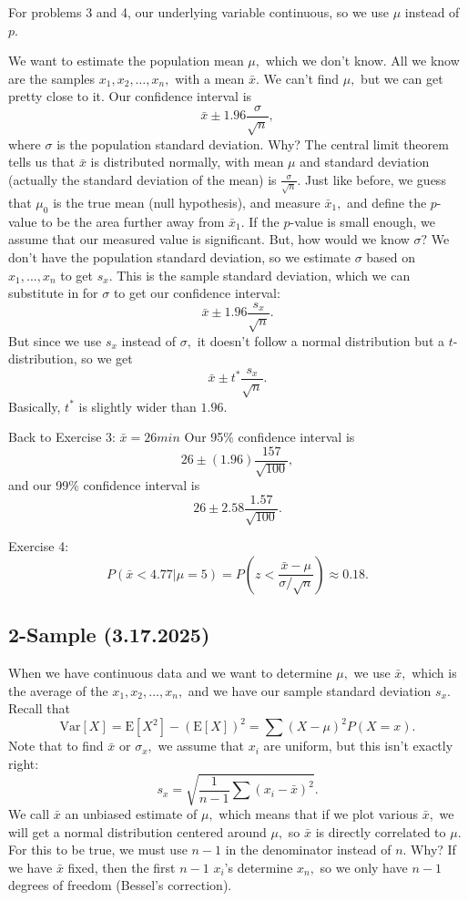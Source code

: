 \documentclass[12pt]{article}
\theoremstyle{remark}
\begin{document}
For problems 3 and 4, our underlying variable continuous, so we use $\mu$ instead of $p.$

We want to estimate the population mean $\mu,$ which we don't know. All we know are the samples $x_1,x_2,\dots,x_n,$ with a mean $\bar{x}.$ We can't find $\mu,$ but we can get pretty close to it. Our confidence interval is
\[\bar{x}\pm 1.96\frac{\sigma}{\sqrt{n}},\] where $\sigma$ is the population standard deviation. Why? The central limit theorem tells us that $\bar{x}$ is distributed normally, with mean $\mu$ and standard deviation (actually the standard deviation of the mean) is $\frac{\sigma}{\sqrt{n}}.$ Just like before, we guess that $\mu_0$ is the true mean (null hypothesis), and measure $\bar{x}_1,$ and define the $p$-value to be the area further away from $\bar{x}_1.$ If the $p$-value is small enough, we assume that our measured value is significant. But, how would we know $\sigma?$ We don't have the population standard deviation, so we estimate $\sigma$ based on $x_1,\dots,x_n$ to get $s_x.$ This is the sample standard deviation, which we can substitute in for $\sigma$ to get our confidence interval:
\[\bar{x}\pm 1.96\frac{s_x}{\sqrt{n}}.\] But since we use $s_x$ instead of $\sigma,$ it doesn't follow a normal distribution but a $t$-distribution, so we get
\[\bar{x}\pm t^\ast\frac{s_x}{\sqrt{n}}.\] Basically, $t^\ast$ is slightly wider than $1.96.$


Back to Exercise 3:
$\bar{x}=26\si{min}$
Our 95\% confidence interval is
\[26\pm (1.96)\frac{157}{\sqrt{100}},\] and our 99\% confidence interval is \[26\pm2.58\frac{1.57}{\sqrt{100}}.\]

Exercise 4:
\[P(\bar{x}<4.77|\mu=5)=P\left(z<\frac{\bar{x}-\mu}{\sigma/\sqrt{n}}\right)\approx0.18.\]
\subsection{2-Sample (3.17.2025)}
When we have continuous data and we want to determine $\mu,$ we use $\bar{x},$ which is the average of the $x_1,x_2,\dots,x_n,$ and we have our sample standard deviation $s_x.$ Recall that
\[\mathrm{Var}[X]=\mathrm{E}[X^2]-(\mathrm{E}[X])^2=\sum (X-\mu)^2P(X=x).\] Note that to find $\bar{x}$ or $\sigma_x,$ we assume that $x_i$ are uniform, but this isn't exactly right:
\[s_x=\sqrt{\frac{1}{n-1}\sum(x_i-\bar{x})^2}.\] We call $\bar{x}$ an unbiased estimate of $\mu,$ which means that if we plot various $\bar{x},$ we will get a normal distribution centered around $\mu,$ so $\bar{x}$ is directly correlated to $\mu.$ For this to be true, we must use $n-1$ in the denominator instead of $n.$ Why? If we have $\bar{x}$ fixed, then the first $n-1$ $x_i$'s determine $x_n,$ so we only have $n-1$ degrees of freedom (Bessel's correction).
\end{document}
